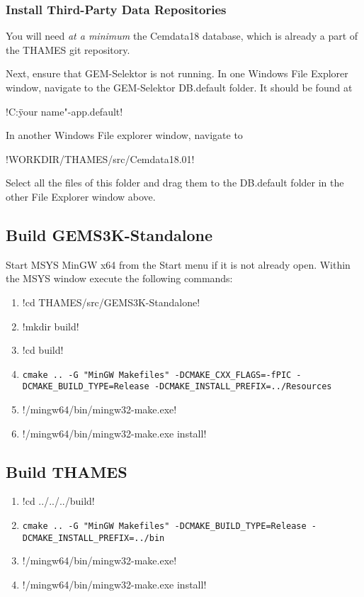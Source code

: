 \documentclass{article}
\begin{document}
\subsubsection{\label{sec:thirdpartywindows}Install Third-Party Data Repositories}
You will need \textit{at a minimum} the Cemdata18 database, which is already a
part of the THAMES git repository.

Next, ensure that GEM-Selektor is not running.
In one Windows File Explorer window, navigate to the GEM-Selektor DB.default
folder. It should be found at

!C:\Users\"your name"-app\Resources\DB.default!

In another Windows File explorer window, navigate to

!WORKDIR/THAMES/src/Cemdata18.01!

Select all the files of this folder and drag them to the DB.default folder
in the other File Explorer window above.

\subsection{Build GEMS3K-Standalone}
Start MSYS MinGW x64 from the Start menu if it is not already open. Within the
MSYS window execute the following commands:
\begin{enumerate}
  \item !cd THAMES/src/GEMS3K-Standalone!
  \item !mkdir build!
  \item !cd build!
  \item
    \begin{Verbatim}[breaklines=true]
      cmake .. -G "MinGW Makefiles" -DCMAKE_CXX_FLAGS=-fPIC -DCMAKE_BUILD_TYPE=Release -DCMAKE_INSTALL_PREFIX=../Resources
    \end{Verbatim}
  \item !/mingw64/bin/mingw32-make.exe!
  \item !/mingw64/bin/mingw32-make.exe install!
\end{enumerate}
 
\subsection{Build THAMES}
\begin{enumerate}
\item !cd ../../../build!
\item
  \begin{Verbatim}[breaklines=true]
    cmake .. -G "MinGW Makefiles" -DCMAKE_BUILD_TYPE=Release -DCMAKE_INSTALL_PREFIX=../bin
  \end{Verbatim}
\item !/mingw64/bin/mingw32-make.exe!
\item !/mingw64/bin/mingw32-make.exe install!
\end{enumerate}
 
\end{document}
